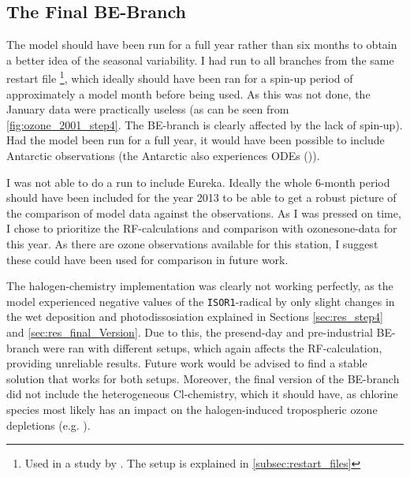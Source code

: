 \subsection{The Final BE-Branch}


The model should have been run for a full year rather than six months to obtain a better idea of the seasonal variability. I had run to all branches from the same restart file \footnote{Used in a study by \cite{Falk_2019}. The setup is explained in \ref{subsec:restart_files}}, which ideally should have been ran for a spin-up period of approximately a model month before being used. As this was not done, the January data were practically useless (as can be seen from \ref{fig:ozone_2001_step4}. The BE-branch is clearly affected by the lack of spin-up). Had the model been run for a full year, it would have been possible to include Antarctic observations (the Antarctic also experiences ODEs (\cite{Simpson2015})).

\medskip
I was not able to do a run to include Eureka. Ideally the whole 6-month period should have been included for the year 2013 to be able to get a robust picture of the comparison of model data against the observations. As I was pressed on time, I chose to prioritize the RF-calculations and comparison with ozonesone-data for this year. As there are ozone observations available for this station, I suggest these could have been used for comparison in future work. 

\medskip

The halogen-chemistry implementation was clearly not working perfectly, as the model experienced negative values of the \texttt{ISOR1}-radical by only slight changes in the wet deposition and photodissosiation explained in Sections \ref{sec:res_step4} and \ref{sec:res_final_Version}. Due to this, the presend-day and pre-industrial BE-branch were ran with different setups, which again affects the RF-calculation, providing unreliable results. Future work would be advised to find a stable solution that works for both setups. Moreover, the final version of the BE-branch did not include the heterogeneous Cl-chemistry, which it should have, as chlorine species most likely has an impact on the halogen-induced tropospheric ozone depletions (e.g. \cite{FinlaysonPitts2010}).